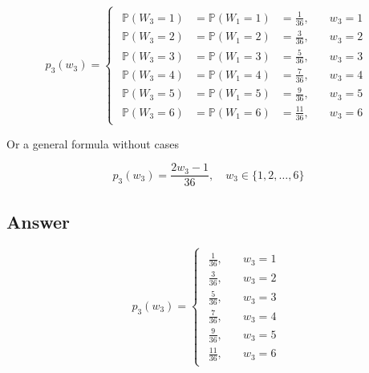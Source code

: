 \documentclass[12pt]{article}
\newcommand{\bP}{\mathbb{P}}
\begin{document}
\begin{enumerate}[start=1,label={\bfseries Part \arabic*:},leftmargin=0in]
			\[
			p_3(w_3) =
			\begin{cases}
				\begin{aligned}
					\bP(W_3 = 1) &= \bP(W_1 = 1) &= \frac{1}{36},&\quad w_3 = 1\\
					\bP(W_3 = 2) &= \bP(W_1 = 2) &= \frac{3}{36},&\quad w_3 = 2\\
					\bP(W_3 = 3) &= \bP(W_1 = 3) &= \frac{5}{36},&\quad w_3 = 3\\
					\bP(W_3 = 4) &= \bP(W_1 = 4) &= \frac{7}{36},&\quad w_3 = 4\\
					\bP(W_3 = 5) &= \bP(W_1 = 5) &= \frac{9}{36},&\quad w_3 = 5\\
					\bP(W_3 = 6) &= \bP(W_1 = 6) &= \frac{11}{36},&\quad w_3 = 6
				\end{aligned}
			\end{cases}
			\]
			
			Or a general formula without cases
			
			\[p_3(w_3) = \frac{2w_3-1}{36},\quad w_3\in \{1,2,\dots,6\}\]
		
		\subsection*{Answer}
		
			\[\boxed{p_3(w_3) =
				\begin{cases}
					\begin{aligned}
						\frac{1}{36},&\quad w_3 = 1\\
						\frac{3}{36},&\quad w_3 = 2\\
						\frac{5}{36},&\quad w_3 = 3\\
						\frac{7}{36},&\quad w_3 = 4\\
						\frac{9}{36},&\quad w_3 = 5\\
						\frac{11}{36},&\quad w_3 = 6
					\end{aligned}
			\end{cases}}\]
	\end{enumerate}
	
\end{document}
